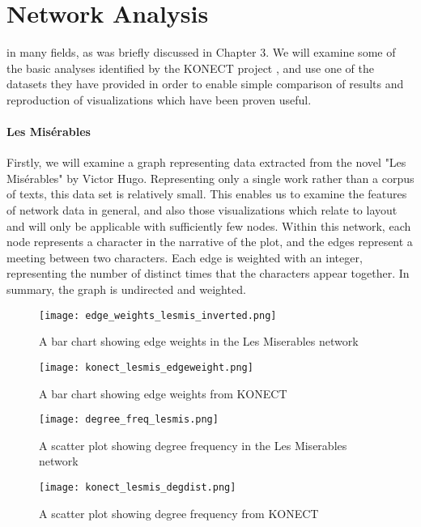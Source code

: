 \section{Network Analysis}
\label{sec:network}
 in many fields, as was briefly discussed in Chapter 3. We will examine some of the basic analyses identified by the KONECT project \cite{Kunegis2013}, and use one of the datasets they have provided in order to enable simple comparison of results and reproduction of visualizations which have been proven useful.

\paragraph{Les Misérables}
Firstly, we will examine a graph representing data extracted from the novel "Les Misérables" by Victor Hugo. Representing only a single work rather than a corpus of texts, this data set is relatively small. This enables us to examine the features of network data in general, and also those visualizations which relate to layout and will only be applicable with sufficiently few nodes. Within this network, each node represents a character in the narrative of the plot, and the edges represent a meeting between two characters. Each edge is weighted with an integer, representing the number of distinct times that the characters appear together. In summary, the graph is undirected and weighted.

\begin{figure}
	\centering
	\begin{minipage}{0.45\textwidth}
		\centering
		\label{fig:edgeweightslesmis}
		\texttt{[image: edge\_weights\_lesmis\_inverted.png]}
		\caption{A bar chart showing edge weights in the Les Miserables network}
	\end{minipage}\hfill
	\begin{minipage}{0.45\textwidth}
		\centering
		\label{fig:edgeweightskonect}
		\texttt{[image: konect\_lesmis\_edgeweight.png]}
		\caption{A bar chart showing edge weights from KONECT}
	\end{minipage}
\end{figure}

\begin{figure}
	\centering
	\begin{minipage}{0.45\textwidth}
		\centering
		\label{fig:edgeweightslesmis}
		\texttt{[image: degree\_freq\_lesmis.png]}
		\caption{A scatter plot showing degree frequency in the Les Miserables network}
	\end{minipage}\hfill
	\begin{minipage}{0.45\textwidth}
		\centering
		\label{fig:edgeweightskonect}
		\texttt{[image: konect\_lesmis\_degdist.png]}
		\caption{A scatter plot showing degree frequency from KONECT}
	\end{minipage}
\end{figure}
